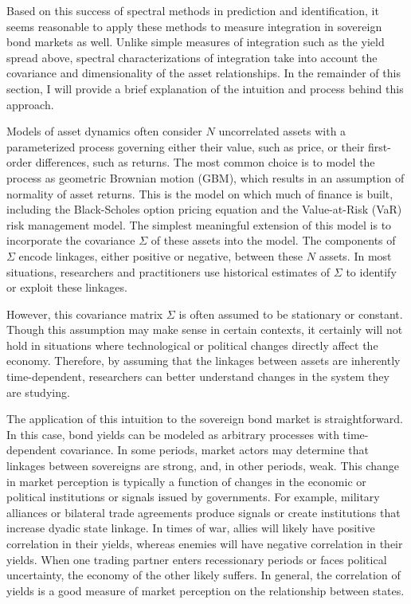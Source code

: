 \documentclass[3p]{elsarticle}
\begin{document}
Based on this success of spectral methods in prediction and identification, it seems reasonable to apply these methods to measure integration in sovereign bond markets as well.  Unlike simple measures of integration such as the yield spread above, spectral characterizations of integration take into account the covariance and dimensionality of the asset relationships.  In the remainder of this section, I will provide a brief explanation of the intuition and process behind this approach.

Models of asset dynamics often consider $N$ uncorrelated assets with a parameterized process governing either their value, such as price, or their first-order differences, such as returns.  The most common choice is to model the process as geometric Brownian motion (GBM), which results in an assumption of normality of asset returns.  This is the model on which much of finance is built, including the Black-Scholes option pricing equation and the Value-at-Risk (VaR) risk management model.  The simplest meaningful extension of this model is to incorporate the covariance $\Sigma$ of these assets into the model.  The components of $\Sigma$ encode linkages, either positive or negative, between these $N$ assets.  In most situations, researchers and practitioners use historical estimates of $\Sigma$ to identify or exploit these linkages.

However, this covariance matrix $\Sigma$ is often assumed to be stationary or constant.  Though this assumption may make sense in certain contexts, it certainly will not hold in situations where technological or political changes directly affect the economy.  Therefore, by assuming that the linkages between assets are inherently time-dependent, researchers can better understand changes in the system they are studying.

The application of this intuition to the sovereign bond market is straightforward.  In this case, bond yields can be modeled as arbitrary processes with time-dependent covariance.  In some periods, market actors may determine that linkages between sovereigns are strong, and, in other periods, weak.  This change in market perception is typically a function of changes in the economic or political institutions or signals issued by governments.  For example, military alliances or bilateral trade agreements produce signals or create institutions that increase dyadic state linkage.  In times of war, allies will likely have positive correlation in their yields, whereas enemies will have negative correlation in their yields.  When one trading partner enters recessionary periods or faces political uncertainty, the economy of the other likely suffers.  In general, the correlation of yields is a good measure of market perception on the relationship between states.
\end{document}
